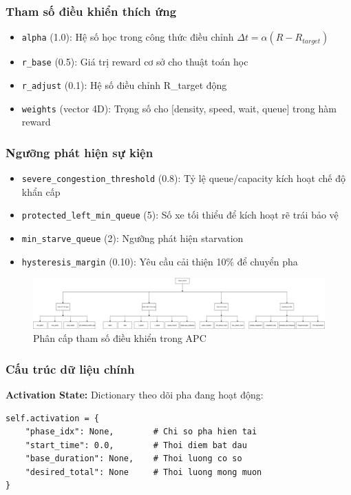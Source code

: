 \subsubsection{Tham số điều khiển thích ứng}
\begin{itemize}
    \item \texttt{alpha} (1.0): Hệ số học trong công thức điều chỉnh $\Delta t = \alpha(R - R_{target})$
    \item \texttt{r\_base} (0.5): Giá trị reward cơ sở cho thuật toán học
    \item \texttt{r\_adjust} (0.1): Hệ số điều chỉnh R\_target động
    \item \texttt{weights} (vector 4D): Trọng số cho [density, speed, wait, queue] trong hàm reward
\end{itemize}

\subsubsection{Ngưỡng phát hiện sự kiện}
\begin{itemize}
    \item \texttt{severe\_congestion\_threshold} (0.8): Tỷ lệ queue/capacity kích hoạt chế độ khẩn cấp
    \item \texttt{protected\_left\_min\_queue} (5): Số xe tối thiểu để kích hoạt rẽ trái bảo vệ
    \item \texttt{min\_starve\_queue} (2): Ngưỡng phát hiện starvation
    \item \texttt{hysteresis\_margin} (0.10): Yêu cầu cải thiện 10\% để chuyển pha
\end{itemize}
\begin{figure}[H]
    \centering
    \includegraphics[width=1.1\textwidth]{Untitled Diagram.drawio (8).png}
    \caption{Phân cấp tham số điều khiển trong APC}
    \label{fig:parameter_hierarchy}
\end{figure}
\subsubsection{Cấu trúc dữ liệu chính}

\textbf{Activation State:} Dictionary theo dõi pha đang hoạt động:
\begin{lstlisting}[style=py]
self.activation = {
    "phase_idx": None,        # Chi so pha hien tai
    "start_time": 0.0,        # Thoi diem bat dau
    "base_duration": None,    # Thoi luong co so
    "desired_total": None     # Thoi luong mong muon
}
\end{lstlisting}

